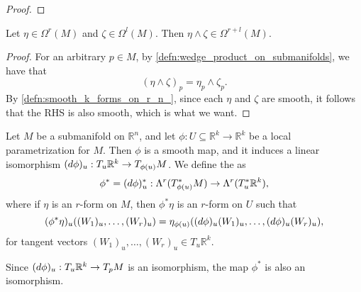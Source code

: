 \documentclass[notoc,notitlepage]{tufte-book}
\begin{document}
\begin{proof}
\end{proof}

\begin{propo}\label{propo:smoothness_of_wedge_products_on_submanifolds}
  Let $\eta \in \Omega^r(M)$ and $\zeta \in \Omega^l(M)$. Then $\eta \land \zeta
  \in \Omega^{r+l}(M)$.
\end{propo}

\begin{proof}
  For an arbitrary $p \in M$, by \cref{defn:wedge_product_on_submanifolds}, we
  have that
  \begin{equation*}
    (\eta \land \zeta)_p = \eta_p \land \zeta_p.
  \end{equation*}
  By \cref{defn:smooth_k_forms_on_r_n_}, since each $\eta$ and $\zeta$ are
  smooth, it follows that the RHS is also smooth, which is what we want.
\end{proof}

\begin{defn}\label{defn:pullback_maps_on_submanifolds}
  Let $M$ be a submanifold on $\mathbb{R}^n$, and let $\phi : U \subseteq
  \mathbb{R}^k \to \mathbb{R}^k$ be a local parametrization for $M$. Then $\phi$ 
  is a smooth map, and it induces a linear isomorphism $(\mathop{}\!d{\phi})_u : T_u
  \mathbb{R}^k \to T_{\phi(u)} M$. We define the  as
  \begin{equation*}
    \phi^* = (\mathop{}\!d{\phi})_u^* : \Lambda^r(T_{\phi(u)}^* M) \to \Lambda^r(T_u^*
    \mathbb{R}^k),
  \end{equation*}
  where if $\eta$ is an $r$-form on $M$, then $\phi^* \eta$ is an $r$-form on
  $U$ such that
  \begin{equation}\label{eq:pullback_maps_on_submanifolds}
    (\phi^* \eta)_u((W_1)_u, \ldots, (W_r)_u) = \eta_{\phi(u)} ((\mathop{}\!d{\phi})_u
    (W_1)_u, \ldots, (\mathop{}\!d{\phi})_u(W_r)_u),
  \end{equation}
  for tangent vectors $(W_1)_u, \ldots, (W_r)_u \in T_u \mathbb{R}^k$.
\end{defn}

\begin{note}
  Since $(\mathop{}\!d{\phi})_u : T_u \mathbb{R}^k \to T_p M$ is an isomorphism, the map
  $\phi^*$ is also an isomorphism.
\end{note}

\end{document}
